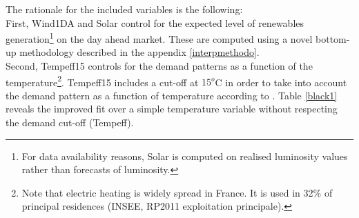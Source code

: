 The rationale for the included variables is the following: \\

First, Wind1DA and Solar control for the expected level of renewables generation\footnote{For data availability reasons, Solar is computed on realised luminosity values rather than forecasts of luminosity.} on the day ahead market. These are computed using a novel bottom-up methodology described in the appendix \ref{interpmethodo}. \\

Second, Tempeff15 controls for the demand patterns as a function of the temperature\footnote{Note that electric heating is widely spread in France. It is used in 32\% of principal residences (INSEE, RP2011 exploitation principale).}. 
Tempeff15 includes a cut-off at $15^o$C in order to take into account the demand pattern as a function of temperature according to \cite{rtewebsite1}. Table \ref{black1} reveals the improved fit over a simple temperature variable without respecting the demand cut-off (Tempeff). \\

